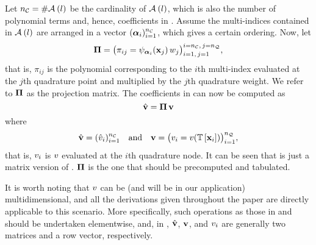Let ${n_\mathcal{C}} = \# \mathcal{A}_{}\left( l \right)$ be the cardinality of $\mathcal{A}_{}\left( l \right)$, which is also the number of polynomial terms and, hence, coefficients in .
Assume the multi-indices contained in $\mathcal{A}_{}\left( l \right)$ are arranged in a vector $(\bm{\alpha}_i)_{i = 1}^{n_\mathcal{C}}$, which gives a certain ordering.
Now, let
\begin{equation} \elab{projection-matrix}
  \projection = \big( \pi_{ij} = \polynomial_{\multiindex_i}(\point_j) \, \weight_j \big)_{i = 1, \, j = 1}^{i = \ncorder, \, j = \nqorder},
\end{equation}
that is, $\pi_{ij}$ is the polynomial corresponding to the $i$th multi-index evaluated at the $j$th quadrature point and multiplied by the $j$th quadrature weight.
We refer to $\bm{\Pi}$ as the projection matrix.
The coefficients in  can now be computed as
\begin{equation} \elab{coefficient-evaluation}
  \coefficient{\vw} = \projection \, \vw
\end{equation}
where
\begin{equation} \elab{quantity-evaluation}
  \coefficient{\vw} = (\coefficient{\w}_i)_{i = 1}^\ncorder \hspace{1em} \text{and} \hspace{1em} \vw = \big( \w_i = \w(\transformation{\point_i}) \big)_{i = 1}^\nqorder,
\end{equation}
that is, $v_i$ is $v$ evaluated at the $i$th quadrature node.
It can be seen that  is just a matrix version of .
$\bm{\Pi}$ is the one that should be precomputed and tabulated.

\begin{remark} 
It is worth noting that $v$ can be (and will be in our application) multidimensional, and all the derivations given throughout the paper are directly applicable to this scenario.
More specifically, such operations as those in  and  should be undertaken elementwise, and, in , $\hat{\mathbf{v}}$, $\mathbf{v}$, and $v_i$ are generally two matrices and a row vector, respectively.
\end{remark}
